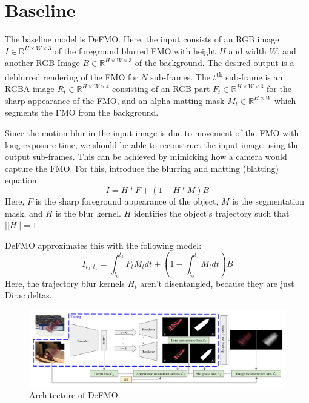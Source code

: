 \section{Baseline}

The baseline model is DeFMO.\@
Here, the input consists of an RGB image $I \in \mathbb{R}^{H \times W \times 3}$ of the foreground blurred FMO with height $H$ and width $W$, and another RGB Image $B \in \mathbb{R}^{H \times W \times 3}$ of the background.
The desired output is a deblurred rendering of the FMO for $N$ sub-frames.
The $t$\textsuperscript{th} sub-frame is an RGBA image $R_t \in \mathbb{R}^{H \times W \times 4}$ consisting of an RGB part $F_t \in \mathbb{R}^{H \times W \times 3}$ for the sharp appearance of the FMO, and an alpha matting mask $M_t \in \mathbb{R}^{H \times W}$ which segments the FMO from the background.

Since the motion blur in the input image is due to movement of the FMO with long exposure time, we should be able to reconstruct the input image using the output sub-frames.
This can be achieved by mimicking how a camera would capture the FMO.\@
For this, \citet{blatting-1,blatting-2} introduce the blurring and matting (blatting) equation:
\begin{equation}
    I = H \ast F + (1 - H \ast M) B \label{eq:blatting}
\end{equation}
Here, $F$ is the sharp foreground appearance of the object, $M$ is the segmentation mask, and $H$ is the blur kernel.
$H$ identifies the object's trajectory such that $||H|| = 1$.

DeFMO approximates this with the following model:
\begin{equation}
    I_{t_0:t_1} = \int_{t_0}^{t_1} F_t M_t dt + \left( 1 - \int_{t_0}^{t_1} M_t dt \right) B \label{eq:defmo-blatting}
\end{equation}
Here, the trajectory blur kernels $H_t$ aren't disentangled, because they are just Dirac deltas.

\begin{figure}
    \centering
    \includegraphics[width=\textwidth]{images/defmo-arch.png}
    \caption{Architecture of DeFMO.}%
    \label{fig:defmo-arch}
\end{figure}

